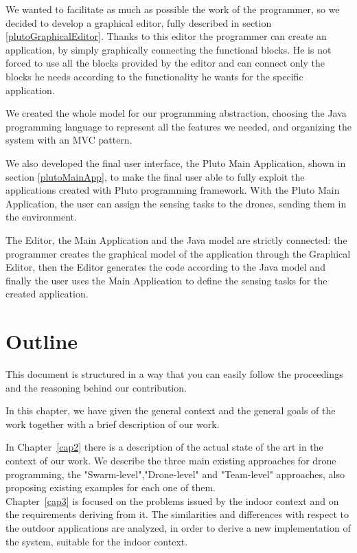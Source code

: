 We wanted to facilitate as much as possible the work of the programmer, so we decided to develop a graphical editor, fully described in section \ref{plutoGraphicalEditor}.
Thanks to this editor the programmer can create an application, by simply graphically connecting the functional blocks.
He is not forced to use all the blocks provided by the editor and can connect only the blocks he needs according to the functionality he wants for the specific application.

We created the whole model for our programming abstraction, choosing the Java programming language to represent all the features we needed, and organizing the system with an MVC pattern.

We also developed the final user interface, the Pluto Main Application, shown in section \ref{plutoMainApp}, to make the final user able to fully exploit the applications created with Pluto programming framework.
With the Pluto Main Application, the user can assign the sensing tasks to the drones, sending them in the environment.

The Editor, the Main Application and the Java model are strictly connected:
the programmer creates the graphical model of the application through the Graphical Editor, then the Editor generates the code according to the Java model and finally the user uses the Main Application to define the sensing tasks for the created application.



\section{Outline}

This document is structured in a way that you can easily follow the proceedings and the reasoning behind our contribution.

In this chapter, we have given the general context and the general goals of the work together with a brief description of our work.

In Chapter~\ref{cap2} there is a description of the actual state of the art in the context of our work.
We describe the three main existing approaches for drone programming, the "Swarm-level","Drone-level" and "Team-level" approaches, also proposing existing examples for each one of them.
\\

Chapter~\ref{cap3} is focused on the problems issued by the indoor context and on the requirements deriving from it.
The similarities and differences with respect to the outdoor applications are analyzed, in order to derive a new implementation of the system, suitable for the indoor context.
\\

